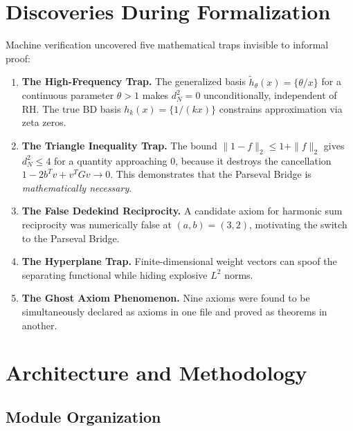\documentclass[11pt,a4paper]{article}
\begin{document}
\section{Discoveries During Formalization}
\label{sec:traps}

Machine verification uncovered five mathematical traps invisible
to informal proof:

\begin{enumerate}
  \item \textbf{The High-Frequency Trap.} The generalized basis
    $\tilde{h}_\theta(x) = \{\theta/x\}$ for a continuous parameter
    $\theta > 1$ makes $d_N^2 = 0$ unconditionally,
    independent of RH. The true BD basis
    $h_k(x) = \{1/(kx)\}$ constrains approximation via zeta zeros.

  \item \textbf{The Triangle Inequality Trap.} The bound
    $\|1-f\|_2 \leq 1+\|f\|_2$ gives $d_N^2 \leq 4$ for a quantity
    approaching $0$, because it destroys the cancellation
    $1 - 2b^Tv + v^TGv \to 0$. This demonstrates that the Parseval
    Bridge is \emph{mathematically necessary}.

  \item \textbf{The False Dedekind Reciprocity.} A candidate axiom
    for harmonic sum reciprocity was numerically false at
    $(a,b) = (3,2)$, motivating the switch to the Parseval Bridge.

  \item \textbf{The Hyperplane Trap.} Finite-dimensional weight
    vectors can spoof the separating functional while hiding
    explosive $L^2$ norms.

  \item \textbf{The Ghost Axiom Phenomenon.} Nine axioms were
    found to be simultaneously declared as axioms in one file and
    proved as theorems in another.
\end{enumerate}

\section{Architecture and Methodology}
\label{sec:architecture}

\subsection{Module Organization}
\end{document}
